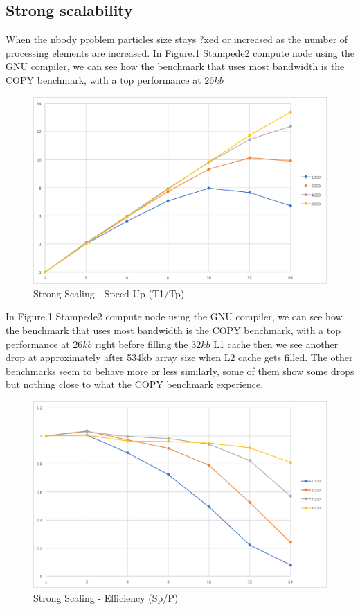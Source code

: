 \documentclass[12pt]{article} %
\begin{document}
\subsection{Strong scalability}
When the nbody problem particles size stays ?xed or increased as the number of processing elements are increased. In Figure.1 Stampede2 compute node using the GNU compiler, we can see how the benchmark that uses most bandwidth is the \textsc{COPY} benchmark, with a top performance at $26kb$

\begin{figure}[htb]
\caption{Strong Scaling - Speed-Up (T1/Tp)}\label{fig:benchmark01}
\centering
\includegraphics[width=\textwidth,keepaspectratio]{imgs/img01.png}
\end{figure} 


\newpage

In Figure.1 Stampede2 compute node using the GNU compiler, we can see how the benchmark that uses most bandwidth is the \textsc{COPY} benchmark, with a top performance at $26kb$ right before filling the $32kb$ L1 cache then we see another drop at approximately after 534kb array size when L2 cache gets  filled. The other benchmarks seem to behave more or less similarly, some of them show some drops but nothing close to what the \textsc{COPY} benchmark experience.

\begin{figure}[htb]
\caption{Strong Scaling - Efficiency (Sp/P)}\label{fig:benchmark01}
\centering
\includegraphics[width=\textwidth,keepaspectratio]{imgs/img02.png}
\end{figure} 
\end{document}
